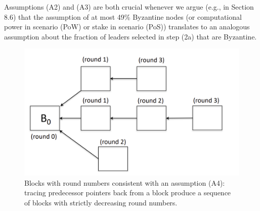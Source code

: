 Assumptions (A2) and (A3) are both crucial whenever we argue (e.g., in Section 8.6) that
the assumption of at most 49\% Byzantine nodes (or computational power in scenario (PoW)
or stake in scenario (PoS)) translates to an analogous assumption about the fraction of
leaders selected in step (2a) that are Byzantine.\\
\begin{figure}[h]
    \centering
    \includegraphics[scale = 0.5]{figures/f23.png}
    \caption{Blocks with round numbers consistent with an assumption (A4): tracing predecessor
pointers back from a block produce a sequence of blocks with strictly decreasing round
numbers.}
    \label{fig:mesh1}
\end{figure}\\

